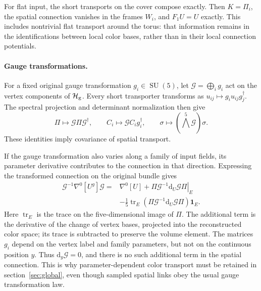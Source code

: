\documentclass[11pt,a4paper]{article}
\theoremstyle{remark}
\DeclareMathOperator{\tr}{tr}
\DeclareMathOperator{\SU}{SU}
\newcommand{\Id}{\mathbf 1}
\newcommand{\dd}{\mathrm d}
\begin{document}
For flat input, the short transports on the cover compose exactly.
Then $K=\Pi_i$, the spatial connection vanishes in the frames $W_i$, and
$F_1U=U$ exactly. This includes nontrivial flat transport around the
torus: that information remains in the identifications between local
color bases, rather than in their local connection potentials.

\paragraph{Gauge transformations.}
For a fixed original gauge transformation $g_i\in\SU(5)$, let
$\mathcal G=\bigoplus_i g_i$ act on the vertex components of
$\mathcal H_{\rm g}$. Every short transporter transforms as
$u_{ij}\mapsto g_i u_{ij}g_j^\dagger$. The spectral projection
and determinant normalization then give
\begin{equation}
 \Pi\mapsto\mathcal G\Pi\mathcal G^{\dagger},\qquad
 C_i\mapsto\mathcal G C_i g_i^{\dagger},\qquad
 \sigma\mapsto(\bigwedge^5\mathcal G)\sigma .
\end{equation}
These identities imply covariance of spatial transport.

If the gauge transformation also varies along a family of input fields,
its parameter derivative contributes to the connection in that direction.
Expressing the transformed connection on the original bundle gives
\begin{equation}
 \begin{split}
 \mathcal G^{-1}\nabla^0[U^g]\mathcal G
 ={}&\nabla^0[U]
   +\left.\Pi\mathcal G^{-1}\dd_U\mathcal G\Pi\right|_E\\
 &-\tfrac15\tr_E(\Pi\mathcal G^{-1}\dd_U\mathcal G\Pi)\Id_E .
 \end{split}
 \label{app:g:parameter-gauge}
\end{equation}
Here $\tr_E$ is the trace on the five-dimensional image of $\Pi$.
The additional term is the derivative of the change of vertex bases,
projected into the reconstructed color space; its trace is subtracted
to preserve the volume element. The matrices $g_i$ depend on the vertex
label and family parameters, but not on the continuous position $y$.
Thus $\dd_y\mathcal G=0$, and there is no such additional term in
the spatial connection. This is why parameter-dependent color transport
must be retained in section~\ref{sec:global}, even though sampled
spatial links obey the usual gauge transformation law.
\end{document}
